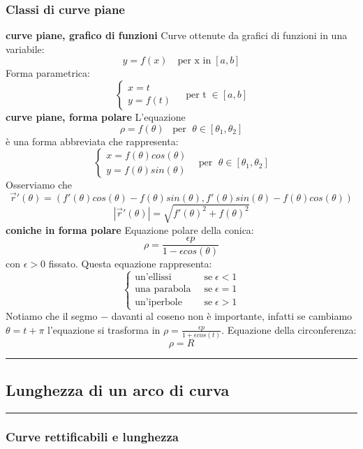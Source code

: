\subsubsection*{Classi di curve piane}
\textbf{curve piane, grafico di funzioni}\newline
Curve ottenute da grafici di funzioni in una variabile:
\[
    y = f(x) \quad\text{per x in} \;[a,b]
\]
Forma parametrica:
\[
    \begin{cases}
        x=t \\
        y=f(t)
    \end{cases} \;\;\;\; \text{per t} \;\in[a,b]
\]
\textbf{curve piane, forma polare}\newline
L'equazione
\[
    \rho = f(\theta) \;\;\;\text{per } \; \theta \in [\theta_1, \theta_2]
\]
è una forma abbreviata che rappresenta:
\[
    \begin{cases}
        x = f(\theta) cos(\theta)\\
        y = f(\theta) sin(\theta)
    \end{cases} \;\;\; \text{per } \; \theta \in [\theta_1, \theta_2]
\]
Osserviamo che 
\[
    \vec{r}'(\theta) = (f'(\theta) cos(\theta)- f(\theta)sin(\theta), f'(\theta) sin(\theta) - f(\theta)cos(\theta))
\]
\[
    |\vec{r}'(\theta)| = \sqrt{f'(\theta)^2 + f(\theta)^2}
\]
\textbf{coniche in forma polare}\newline
Equazione polare della conica:
\[
        \rho = \frac{\epsilon p}{1- \epsilon cos(\theta)}
\]
con $\epsilon > 0$ fissato.\newline
Questa equazione rappresenta:
\[
    \begin{cases}
        \text{un'ellissi} \;\; &\text{se} \; \epsilon< 1\\
        \text{una parabola} \;\; &\text{se} \; \epsilon= 1\\
        \text{un'iperbole} \;\; &\text{se} \; \epsilon> 1
    \end{cases}
\]
Notiamo che il segmo $-$ davanti al coseno non è importante, infatti se cambiamo $\theta = t + \pi$ l'equazione si trasforma in $\rho = \frac{\epsilon p}{1 + \epsilon cos(t)}$.\newline
Equazione della circonferenza:
\[
        \rho = R
\]
\rule{\textwidth}{2pt}
\subsection*{Lunghezza di un arco di curva}
\rule{\textwidth}{0,4pt}
\subsubsection*{Curve rettificabili e lunghezza}
